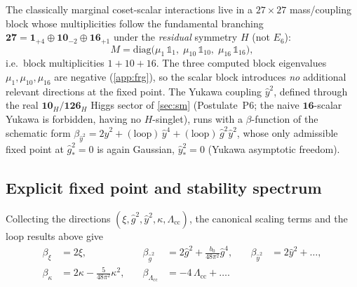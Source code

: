 \documentclass[11pt]{article}
\theoremstyle{plain}
\theoremstyle{definition}
\theoremstyle{remark}
\begin{document}
The classically marginal coset-scalar interactions live in a $27\times27$
mass/coupling block whose multiplicities follow the fundamental branching
$\mathbf{27}=\mathbf{1}_{+4}\oplus\mathbf{10}_{-2}\oplus\mathbf{16}_{+1}$
under the \emph{residual} symmetry $H$ (not $E_{6}$):
\begin{equation}\label{eq:frg:27block}
  M=\mathrm{diag}\bigl(\mu_{1}\,\mathbb{1}_{1},\;
                       \mu_{10}\,\mathbb{1}_{10},\;
                       \mu_{16}\,\mathbb{1}_{16}\bigr),
\end{equation}
i.e.\ block multiplicities $1+10+16$. The three computed block eigenvalues
$\mu_{1},\mu_{10},\mu_{16}$ are negative (\autoref{app:frg}), so the scalar
block introduces \emph{no} additional relevant directions at the fixed
point. The Yukawa coupling $\hat y^{2}$, defined through the real
$\mathbf{10}_{H}/\mathbf{126}_{H}$ Higgs sector of \autoref{sec:sm} (Postulate~P6;
the naive $\mathbf{16}$-scalar Yukawa is forbidden, having no $H$-singlet),
runs with a $\beta$-function of the schematic form
$\beta_{\hat y^{2}}=2\hat y^{2}+(\text{loop})\,\hat y^{4}+(\text{loop})\,\hat g^{2}\hat y^{2}$,
whose only admissible fixed point at $\hat g^{2}_{\ast}=0$ is again Gaussian,
$\hat y^{2}_{\ast}=0$ (Yukawa asymptotic freedom).

\subsection{Explicit fixed point and stability spectrum}
\label{sec:frg:fixedpoint}
\label{sec:gravity:stability}

Collecting the directions $(\xi,\hat g^{2},\hat y^{2},\kappa,\Lambda_{\mathrm{cc}})$,
the canonical scaling terms and the loop results above give
\begin{equation}\label{eq:frg:system}
\begin{aligned}
  \beta_{\xi}&=2\xi,
  &\quad
  \beta_{\hat g^{2}}&=2\hat g^{2}+\frac{b_{0}}{48\pi^{2}}\hat g^{4},
  &\quad
  \beta_{\hat y^{2}}&=2\hat y^{2}+\dots,
  \\[4pt]
  \beta_{\kappa}&=2\kappa-\frac{5}{48\pi^{2}}\kappa^{2},
  &\quad
  \beta_{\Lambda_{\mathrm{cc}}}&=-4\,\Lambda_{\mathrm{cc}}+\dots .
\end{aligned}
\end{equation}
\end{document}
